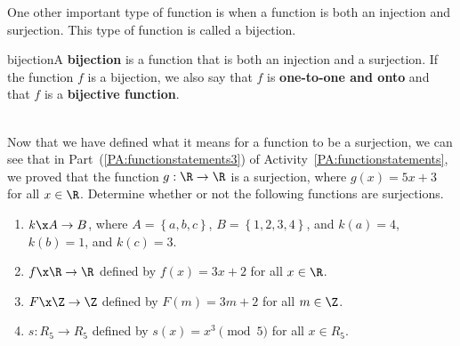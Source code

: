 \begin{center}
\end{center}
%
One other important type of function is when a function is both an injection and surjection.  This type of function is called a bijection.
\begin{defbox}{bijection}{A \textbf{bijection}
%
 is a function that is both an injection and a surjection.  If the function  $f$  is a bijection, we also say that  $f$  is \textbf{one-to-one  and onto} and that  $f$  is a \textbf{bijective function}.}
%
\end{defbox}

\begin{prog} 
\label{pr:functionswithfinitedom} \hfill \\
Now that we have defined what it means for a function to be a surjection, we can see that in Part~(\ref{PA:functionstatements3}) of \typeu Activity~\ref*{PA:functionstatements}, we proved that the function $g: \R \to \R$ is a surjection, where $g ( x ) = 5x + 3$ for all $x \in \R$.  Determine whether or not the following functions are surjections.

\begin{enumerate}
\item $k\x A \to B$, where $A = \left\{a, b, c \right\}$, $B = \left\{1, 2, 3, 4 \right\}$, and 
$k (a) = 4$, $k(b) = 1$, and $k(c) = 3$.

\item $f\x \R \to \R$ defined by $f ( x ) = 3x + 2$ for all $x \in \R$.

\item $F\x \Z \to \Z$ defined by $F ( m ) = 3m + 2$ for all $m \in \Z$.

\item $s:R_5 \to R_5$ defined by $s ( x ) = x^3 \pmod 5$ for all $x \in R_5$.

\end{enumerate}
\end{prog}
\hbreak

\endinput

